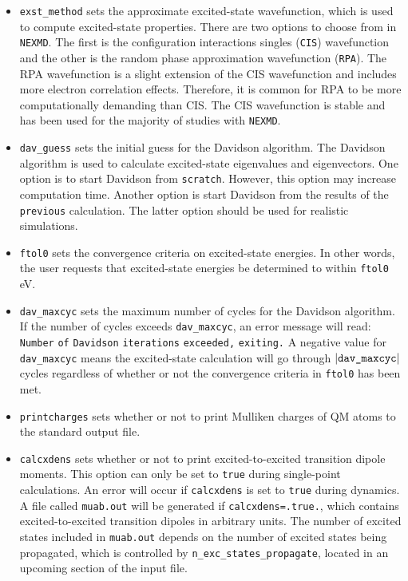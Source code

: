 \begin{itemize}
\item \verb+exst_method+ sets the approximate excited-state wavefunction, which is used to compute excited-state properties.  There are two options to choose from in \verb+NEXMD+.  The first is the configuration interactions singles (\verb+CIS+) wavefunction and the other is the random phase approximation wavefunction (\verb+RPA+).  The RPA wavefunction is a slight extension of the CIS wavefunction and includes more electron correlation effects.  Therefore, it is common for RPA to be more computationally demanding than CIS.  The CIS wavefunction is stable and has been used for the majority of studies with \verb+NEXMD+.
\item \verb+dav_guess+ sets the initial guess for the Davidson algorithm.  The Davidson algorithm is used to calculate excited-state eigenvalues and eigenvectors.  One option is to start Davidson from \verb+scratch+.  However, this option may increase computation time.  Another option is start Davidson from the results of the \verb+previous+ calculation.  The latter option should be used for realistic simulations.
\item \verb+ftol0+ sets the convergence criteria on excited-state energies.  In other words, the user requests that excited-state energies be determined to within \verb+ftol0+ eV.
\item \verb+dav_maxcyc+ sets the maximum number of cycles for the Davidson algorithm.  If the number of cycles exceeds \verb+dav_maxcyc+, an error message will read: \verb+Number+ \verb+of+ \verb+Davidson+ \verb+iterations+ \verb+exceeded,+ \verb+exiting.+  A negative value for \verb+dav_maxcyc+ means the excited-state calculation will go through $\left|\verb+dav_maxcyc+\right|$ cycles regardless of whether or not the convergence criteria in \verb+ftol0+ has been met.
\item \verb+printcharges+ sets whether or not to print Mulliken charges of QM atoms to the standard output file.
\item \verb+calcxdens+ sets whether or not to print excited-to-excited transition dipole moments.  This option can only be set to \verb+true+ during single-point calculations.  An error will occur if \verb+calcxdens+ is set to \verb+true+ during dynamics.  A file called \verb+muab.out+ will be generated if \verb+calcxdens=.true.+, which contains excited-to-excited transition dipoles in arbitrary units.  The number of excited states included in \verb+muab.out+ depends on the number of excited states being propagated, which is controlled by \verb+n_exc_states_propagate+, located in an upcoming section of the input file.
\end{itemize}

